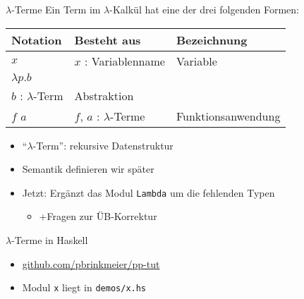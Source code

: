\documentclass{beamer}
\begin{document}
\begin{frame}{$\lambda$-Terme}
	Ein Term im $\lambda$-Kalkül hat eine der drei folgenden Formen:

	\vspace{0.5cm}

	\begin{tabularx}{\textwidth}{ X | X | X }
		\textbf{Notation} & \textbf{Besteht aus}                      & \textbf{Bezeichnung} \\
		\hline
		$x$               & $x$ : Variablenname                       & Variable             \\
		\hline
		$\lambda{}p.b$    &
			\begin{tabular}[t]{@{}c@{}}$p$ : Variablenname\\$b$ : $\lambda$-Term\end{tabular}
									      & Abstraktion          \\
		\hline
		$f$ $a$           & $f$, $a$ : $\lambda$-Terme                & Funktionsanwendung   \\
	\end{tabularx}

	\vspace{0.5cm}

	\begin{itemize}
		\item \enquote{$\lambda$-Term}: rekursive Datenstruktur
		\item Semantik definieren wir später
		\pause
		\item Jetzt: Ergänzt das Modul \texttt{Lambda} um die fehlenden Typen
		\begin{itemize}
			\item +Fragen zur ÜB-Korrektur
		\end{itemize}
	\end{itemize}
\end{frame}

\begin{frame}{$\lambda$-Terme in Haskell}

	\begin{itemize}
                \item \href{https://github.com/pbrinkmeier/pp-tut}{github.com/pbrinkmeier/pp-tut}
		\item Modul \texttt{x} liegt in \texttt{demos/x.hs}
	\end{itemize}
\end{frame}

\newcommand{\aeq}{\stackrel{\alpha}{=}}
\newcommand{\naeq}{\stackrel{\alpha}{\neq}}
\newcommand{\eeq}{\stackrel{\eta}{=}}
\end{document}
